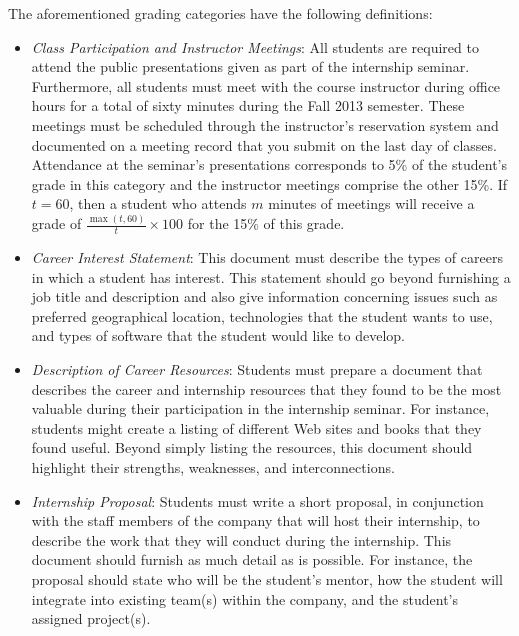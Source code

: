 \noindent
The aforementioned grading categories have the following definitions:

\begin{itemize}

	\item {\em Class Participation and Instructor Meetings}: All students are required to attend the public
		presentations given as part of the internship seminar.  Furthermore, all students must meet with the
		course instructor during office hours for a total of sixty minutes during the Fall 2013 semester.  These
		meetings must be scheduled through the instructor's reservation system and documented on a meeting record that
		you submit on the last day of classes. Attendance at the seminar's presentations corresponds to 5\% of
		the student's grade in this category and the instructor meetings comprise the other 15\%. If $t=60$, then a
		student who attends $m$ minutes of meetings will receive a grade of $\frac{\max{(t,60)}}{t}\times100$ for the 15\%
		of this grade.
		
	\item {\em Career Interest Statement}: This document must describe the types of careers in which a student has
		interest. This statement should go beyond furnishing a job title and description and also give
		information concerning issues such as preferred geographical location, technologies that the student wants to
		use, and types of software that the student would like to develop. 	

	\item {\em Description of Career Resources}:  Students must prepare a document that describes the career and
		internship resources that they found to be the most valuable during their participation in the internship
		seminar. For instance, students might create a listing of different Web sites and books that they found useful. 
		Beyond simply listing the resources, this document should highlight their strengths, weaknesses, and interconnections. 		

	\item {\em Internship Proposal}: Students must write a short proposal, in conjunction with the staff members of the
		company that will host their internship, to describe the work that they will conduct during the internship.
		This document should furnish as much detail as is possible.  For instance, the proposal should state who will be
		the student's mentor, how the student will integrate into existing team(s) within the company, and the
		student's assigned project(s). 


\end{itemize}
